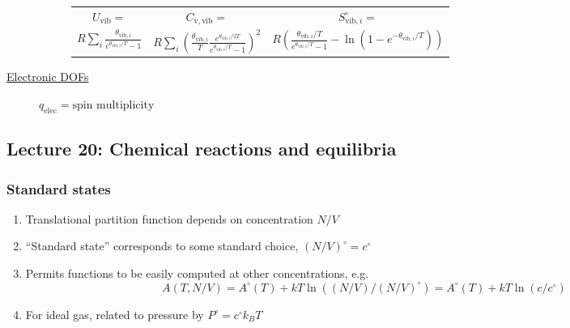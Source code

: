 \documentclass[11pt]{article}
\begin{document}
\begin{table}
\begin{center}
\begin{description}
\begin{description}
\begin{tabular}{ccc}
$ U_\mathrm{vib}= $ & $  C_\mathrm{v,vib} = $ & $S^\circ_{\mathrm{vib},i}=$ \\
$\displaystyle
R\sum_i\frac{\theta_{\mathrm{vib},i}}{e^{\theta_{\mathrm{vib},i}/T}-1}$ &
$\displaystyle R \sum_i \left (
  \frac{\theta_{\mathrm{vib},i}}{T}\frac{e^{\theta_{\mathrm{vib},i}/2T}}{e^{\theta_{\mathrm{vib},i}/T}-1}
\right )^2 $ & $\displaystyle R \left ( \frac{\theta_{\mathrm{vib},i}/T}{e^{\theta_{\mathrm{vib},i}/T}-1}
-\ln(1-e^{-\theta_{\mathrm{vib},i}/T})\right ) $ \\
\end{tabular}

\end{description}
\item[\underline{Electronic DOFs}] {}
$q_\mathrm{elec} = \text{spin multiplicity}$


\end{description}
\end{center}
\end{table}

\subsection{Lecture 20: Chemical reactions and equilibria}
\label{sec:org3fe495e}
\subsubsection{Standard states}
\label{sec:org0da4aae}
\begin{enumerate}
\item Translational partition function depends on concentration \(N/V\)
\item ``Standard state'' corresponds to some standard choice, \((N/V)^\circ = c^\circ\)
\item Permits functions to be easily computed at other concentrations, e.g.
\begin{displaymath}
A(T,N/V)  = A^\circ(T) + k T \ln\left ( (N/V)/(N/V)^\circ \right ) =A^\circ(T) + k T \ln \left ( c/c^\circ \right )
\end{displaymath}
\item For ideal gas, related to pressure by \(P^\circ = c^\circ k_B T\)
\end{enumerate}
\end{document}
